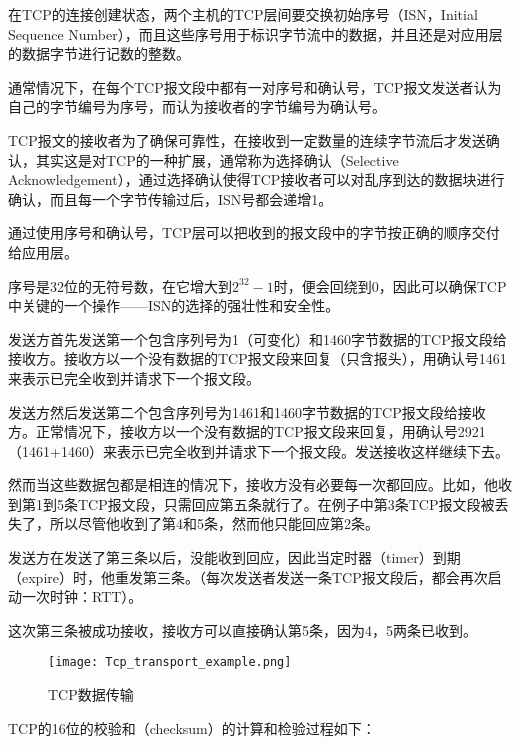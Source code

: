 在TCP的连接创建状态，两个主机的TCP层间要交换初始序号（ISN，Initial Sequence Number），而且这些序号用于标识字节流中的数据，并且还是对应用层的数据字节进行记数的整数。

通常情况下，在每个TCP报文段中都有一对序号和确认号，TCP报文发送者认为自己的字节编号为序号，而认为接收者的字节编号为确认号。

TCP报文的接收者为了确保可靠性，在接收到一定数量的连续字节流后才发送确认，其实这是对TCP的一种扩展，通常称为选择确认（Selective Acknowledgement），通过选择确认使得TCP接收者可以对乱序到达的数据块进行确认，而且每一个字节传输过后，ISN号都会递增1。


通过使用序号和确认号，TCP层可以把收到的报文段中的字节按正确的顺序交付给应用层。

序号是32位的无符号数，在它增大到$2^{32}-1$时，便会回绕到0，因此可以确保TCP中关键的一个操作——ISN的选择的强壮性和安全性。

\begin{compactenum}
\item 发送方首先发送第一个包含序列号为1（可变化）和1460字节数据的TCP报文段给接收方。接收方以一个没有数据的TCP报文段来回复（只含报头），用确认号1461来表示已完全收到并请求下一个报文段。

\item 发送方然后发送第二个包含序列号为1461和1460字节数据的TCP报文段给接收方。正常情况下，接收方以一个没有数据的TCP报文段来回复，用确认号2921（1461+1460）来表示已完全收到并请求下一个报文段。发送接收这样继续下去。

\item 然而当这些数据包都是相连的情况下，接收方没有必要每一次都回应。比如，他收到第1到5条TCP报文段，只需回应第五条就行了。在例子中第3条TCP报文段被丢失了，所以尽管他收到了第4和5条，然而他只能回应第2条。

\item 发送方在发送了第三条以后，没能收到回应，因此当定时器（timer）到期（expire）时，他重发第三条。（每次发送者发送一条TCP报文段后，都会再次启动一次时钟：RTT）。

\item 这次第三条被成功接收，接收方可以直接确认第5条，因为4，5两条已收到。

\end{compactenum}

\begin{figure}[htbp]
\centering
\texttt{[image: Tcp\_transport\_example.png]}
\caption{TCP数据传输}
\end{figure}

TCP的16位的校验和（checksum）的计算和检验过程如下：

